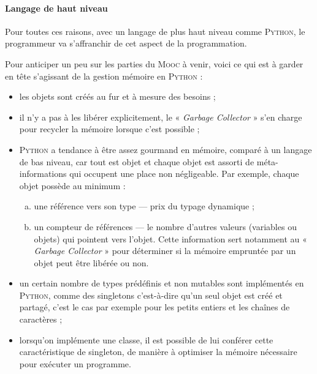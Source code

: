 \paragraph{Langage de haut niveau}

Pour toutes ces raisons, avec un langage de plus haut niveau comme \textsc{Python}, le programmeur va s'affranchir de cet aspect de la programmation.

Pour anticiper un peu sur les parties du \textsc{Mooc} à venir, voici ce qui est à garder en tête s'agissant de la gestion mémoire en \textsc{Python} :
\begin{itemize}
	\item les objets sont créés au fur et à mesure des besoins ;
	\item il n'y a pas à les libérer explicitement, le « \textit{Garbage Collector} » s'en charge pour recycler la mémoire lorsque c'est possible ;
	\item \textsc{Python} a tendance à être assez gourmand en mémoire, comparé à un langage de bas niveau, car tout est objet et chaque objet est assorti de méta-informations qui occupent une place non négligeable. Par exemple, chaque objet possède au minimum :
	\begin{enumerate}[a.]
		\item une référence vers son type --- prix du typage dynamique ;
		\item un compteur de références --- le nombre d'autres valeurs (variables ou objets) qui pointent vers l'objet. Cette information sert notamment au « \textit{Garbage Collector} » pour déterminer si la mémoire empruntée par un objet peut être libérée ou non.
	\end{enumerate}
	\item un certain nombre de types prédéfinis et non mutables sont implémentés en \textsc{Python}, comme des singletons c'est-à-dire qu'un seul objet est créé et partagé, c'est le cas par exemple pour les petits entiers et les chaînes de caractères ;
	\item lorsqu'on implémente une classe, il est possible de lui conférer cette caractéristique de singleton, de manière à optimiser la mémoire nécessaire pour exécuter un programme.
\end{itemize}


